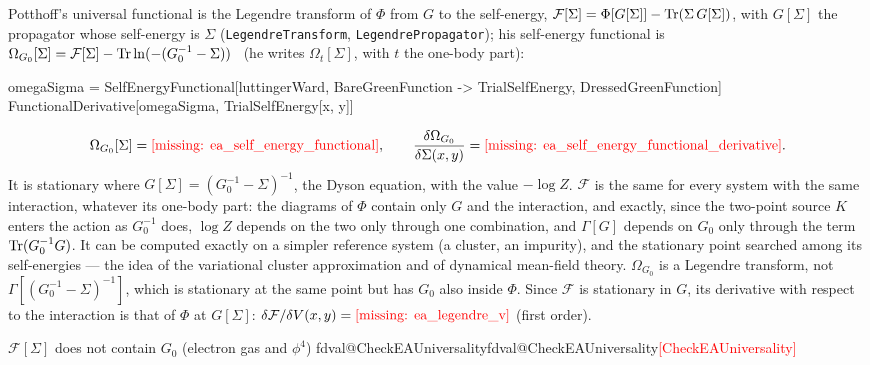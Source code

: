 \documentclass[11pt,a4paper]{article}
\makeatletter
\newcommand{\formula}[1]{\IfFileExists{figures/formula_#1.tex}{}{\text{\textcolor{red}{[missing: \detokenize{#1}]}}}}
\newcommand{\pkg}[1]{\texttt{#1}}
\newcommand{\val}[1]{\ifcsname fdval@#1\endcsname\csname fdval@#1\endcsname\else\textcolor{red}{[#1]}\fi}
\makeatother
\begin{document}
Potthoff's universal functional is the Legendre transform of $\Phi$ from $G$ to the self-energy,
$\mathcal F[\Sigma]=\Phi[G[\Sigma]]-{\rm Tr}(\Sigma\,G[\Sigma])$, with $G[\Sigma]$ the propagator whose self-energy is $\Sigma$
(\pkg{LegendreTransform}, \pkg{LegendrePropagator}); his self-energy functional is
$\Omega_{G_0}[\Sigma]=\mathcal F[\Sigma]-{\rm Tr}\ln(-(G_0^{-1}-\Sigma))$~\cite{Potthoff2003} (he writes $\Omega_t[\Sigma]$, with $t$ the
one-body part):
\begin{code}
omegaSigma = SelfEnergyFunctional[luttingerWard, BareGreenFunction -> TrialSelfEnergy,
    DressedGreenFunction]
FunctionalDerivative[omegaSigma, TrialSelfEnergy[x, y]]
\end{code}
\[
\Omega_{G_0}[\Sigma]=\formula{ea_self_energy_functional},\qquad
\frac{\delta\Omega_{G_0}}{\delta\Sigma(x,y)}=\formula{ea_self_energy_functional_derivative}.
\]
It is stationary where $G[\Sigma]=(G_0^{-1}-\Sigma)^{-1}$, the Dyson equation, with the value $-\log Z$. $\mathcal F$ is the same for
every system with the same interaction, whatever its one-body part: the diagrams of $\Phi$ contain only $G$ and the
interaction, and exactly, since the two-point source $K$ enters the action as $G_0^{-1}$ does, $\log Z$ depends on the two only
through one combination, and $\Gamma[G]$ depends on $G_0$ only through the term ${\rm Tr}(G_0^{-1}G)$. It can be computed exactly on a simpler reference system (a cluster, an impurity), and the stationary
point searched among its self-energies --- the idea of the variational cluster approximation and of dynamical mean-field
theory. $\Omega_{G_0}$ is a Legendre transform, not $\Gamma[(G_0^{-1}-\Sigma)^{-1}]$, which is stationary at the same point but
has $G_0$ also inside $\Phi$. Since $\mathcal F$ is stationary in $G$, its derivative with respect to the interaction is that of $\Phi$
at $G[\Sigma]$:
$\delta\mathcal F/\delta V(x,y)=\formula{ea_legendre_v}$ (first order).
\begin{result}
$\mathcal F[\Sigma]$ does not contain $G_0$ (electron gas and $\phi^4$) \val{CheckEAUniversality}
\end{result}
\end{document}
